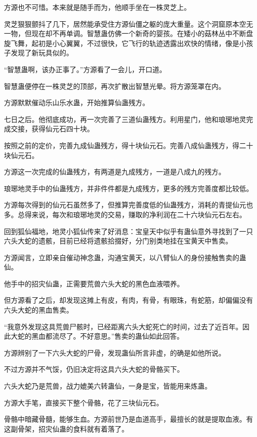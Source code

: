 \begin{this_body}
方源也不可惜。本来就是随手而为，他顺手坐在一株灵芝上。

灵芝狠狠颤抖了几下，居然能承受住方源仙僵之躯的庞大重量。这个洞窟原本空无一物，但现在却不再单调。智慧蛊仿佛一个新奇的婴孩。在矮小的菇林丛中不断盘旋飞舞，起初是小心翼翼，不过很快，它飞行的轨迹透露出欢快的情绪，像是小孩子发现了新玩具似的。

“智慧蛊啊，该办正事了。”方源看了一会儿，开口道。

智慧蛊便停在一株灵芝的顶部，再次扩散出智慧光晕。将方源笼罩在内。

方源默默催动乐山乐水蛊，开始推算仙蛊残方。

七日之后。他彻底成功，再一次完善了三道仙蛊残方。利用星门，他和琅琊地灵完成交接，获得仙元石四十块。

按照之前的定价，完善九成仙蛊残方，得十块仙元石。完善八成仙蛊残方，得二十块仙元石。

方源这一次完成的仙蛊残方，有两道是九成残方，一道是八成九的残方。

琅琊地灵手中的仙蛊残方，并非件件都是九成残方，更多的残方完善度都比较低。

方源每次得到的仙元石虽然多了，但推算完善度低的仙蛊残方，消耗的青提仙元也多。总得来说，每次和琅琊地灵的交易，赚取的净利润在二十六块仙元石左右。

回到狐仙福地，地灵小狐仙传来了好消息：宝皇天中似乎有蛊仙意外寻找到了一只六头大蛇的遗骸，目前已经将遗骸拾掇好，分门别类地挂在宝黄天中售卖。

方源闻言，立即亲自催动神念蛊，沟通宝黄天，以八臂仙人的身份接触售卖的蛊仙。

他手中的招灾仙蛊，正需要荒兽六头大蛇的黑色血液喂养。

但方源看了之后，却发现这摊上有皮，有肉，有骨，有眼珠，有蛇筋，却偏偏没有六头大蛇的黑血售卖。

“我意外发现这具荒兽尸骸时，已经距离六头大蛇死亡的时间，过去了近百年。因此大蛇的黑血都流尽了。不好意思。”售卖的蛊仙如此回答。

方源辨别了一下六头大蛇的尸骨，发现蛊仙所言非虚，的确是如他所说。

不过方源并不气馁，仍旧决定将这具六头大蛇的骨骼买下。

六头大蛇乃是荒兽，战力媲美六转蛊仙，一身是宝，皆能用来炼蛊。

方源大手笔，直接买下整个骨骼，花了三块仙元石。

骨骼中暗藏骨髓，能够生血。方源前世乃是血道高手，最擅长的就是提取血液。有这副骨架，招灾仙蛊的食料就有着落了。


\end{this_body}
